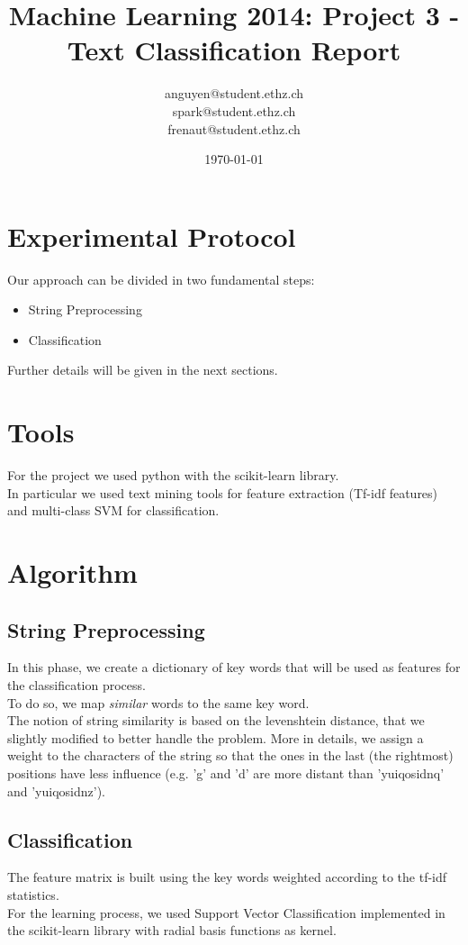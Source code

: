 \documentclass[a4paper, 11pt]{article}
\title{Machine Learning 2014: Project 3 - Text Classification Report}
\author{anguyen@student.ethz.ch\\ spark@student.ethz.ch\\ frenaut@student.ethz.ch\\}
\date{\today}
\begin{document}
\maketitle

\section*{Experimental Protocol}
Our approach can be divided in two fundamental steps:
\begin{itemize}
\item String Preprocessing
\item Classification
\end{itemize}
Further details will be given in the next sections.

\section{Tools}
For the project we used python with the scikit-learn library.\\
In particular we used text mining tools for feature extraction (Tf-idf features)
and multi-class SVM for classification.

\section{Algorithm}
\subsection{String Preprocessing}
In this phase, we create a dictionary of key words that will be used as features for 
the classification process.\\
To do so, we map \emph{similar} words to the same key word.\\
The notion of string similarity is based on the levenshtein distance, that we slightly 
modified to better handle the problem. More in details, we assign a weight to 
the characters of the string so that the ones in the last (the rightmost) positions have 
less influence (e.g. 'g' and 'd' are more distant than 'yuiqosidnq' and 'yuiqosidnz').\\

\subsection{Classification}
The feature matrix is built using the key words weighted according to the tf-idf statistics.\\
For the learning process, we used Support Vector Classification implemented in the scikit-learn
library with radial basis functions as kernel. 
\end{document}
